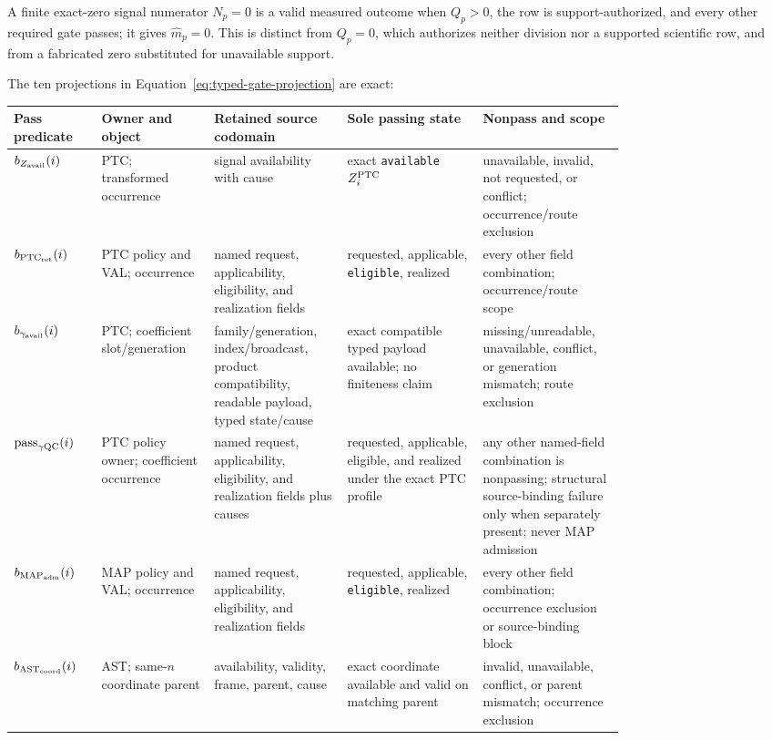 \documentclass[10pt]{article}
\newcommand{\code}[1]{\nolinkurl{#1}}
\begin{document}
\SCIMapObservationEquations

A finite exact-zero signal numerator $N_p=0$ is a valid measured outcome
when $Q_p>0$, the row is support-authorized, and every other required gate
passes; it gives $\widehat m_p=0$. This is distinct from $Q_p=0$, which
authorizes neither division nor a supported scientific row, and from a
fabricated zero substituted for unavailable support.

The ten projections in Equation~\eqref{eq:typed-gate-projection} are exact:

\clearpage
{\footnotesize
\begin{longtable}{L{0.11\linewidth}L{0.15\linewidth}L{0.17\linewidth}L{0.19\linewidth}L{0.16\linewidth}}
\toprule
Pass predicate & Owner and object & Retained source codomain & Sole passing state & Nonpass and scope\\
\midrule
\(b_{Z_{\rm avail}}(i)\) & PTC; transformed occurrence & signal availability with cause & exact \code{available} \(Z_i^{\rm PTC}\) & unavailable, invalid, not requested, or conflict; occurrence/route exclusion\\
\(b_{{\rm PTC}_{\rm ret}}(i)\) & PTC policy and VAL; occurrence & named request, applicability, eligibility, and realization fields & requested, applicable, \code{eligible}, realized & every other field combination; occurrence/route scope\\
\(b_{\gamma_{\rm avail}}(i)\) & PTC; coefficient slot/generation & family/generation, index/broadcast, product compatibility, readable payload, typed state/cause & exact compatible typed payload available; no finiteness claim & missing/unreadable, unavailable, conflict, or generation mismatch; route exclusion\\
\(\mathrm{pass}_{\gamma{\rm QC}}(i)\) & PTC policy owner; coefficient occurrence & named request, applicability, eligibility, and realization fields plus causes & requested, applicable, eligible, and realized under the exact PTC profile & any other named-field combination is nonpassing; structural source-binding failure only when separately present; never MAP admission\\
\(b_{{\rm MAP}_{\rm adm}}(i)\) & MAP policy and VAL; occurrence & named request, applicability, eligibility, and realization fields & requested, applicable, \code{eligible}, realized & every other field combination; occurrence exclusion or source-binding block\\
\(b_{{\rm AST}_{\rm coord}}(i)\) & AST; same-\(n\) coordinate parent & availability, validity, frame, parent, cause & exact coordinate available and valid on matching parent & invalid, unavailable, conflict, or parent mismatch; occurrence exclusion\\

\end{longtable}}
\end{document}
